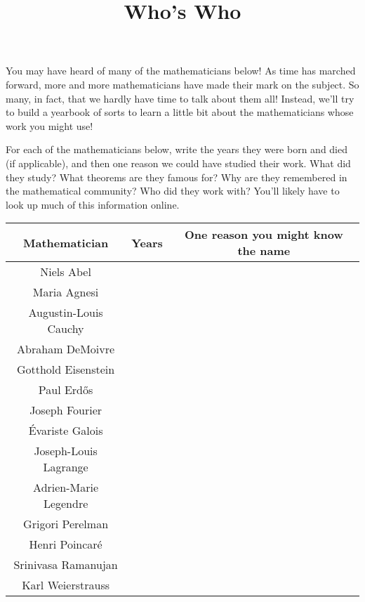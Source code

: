 \documentclass[handout,nooutcomes]{ximera}
\title{Who's Who}
\begin{document}
\begin{abstract}
    
\end{abstract}
\maketitle

You may have heard of many of the mathematicians below!  As time has marched forward, more and more mathematicians have made their mark on the subject.  So many, in fact, that we hardly have time to talk about them all!  Instead, we'll try to build a yearbook of sorts to learn a little bit about the mathematicians whose work you might use!

For each of the mathematicians below, write the years they were born and died (if applicable), and then one reason we could have studied their work.  What did they study?  What theorems are they famous for?  Why are they remembered in the mathematical community?  Who did they work with?  You'll likely have to look up much of this information online.


\begin{center}\begin{tabular}{|c|c|c|}
\hline
Mathematician & Years \hspace{2cm} & One reason you might know the name \hspace{2cm}  \\
\hline \hline

Niels Abel & &   \\ [0.3in]\hline
Maria Agnesi &  &  \\ [0.3in]\hline
Augustin-Louis Cauchy &  &  \\ [0.3in]\hline
Abraham DeMoivre & &   \\ [0.3in] \hline
Gotthold Eisenstein &  &  \\ [0.3in]\hline
Paul Erd\H{o}s &  &  \\ [0.3in]\hline
Joseph Fourier  & &  \\ [0.3in]\hline
\'{E}variste Galois  & &  \\ [0.3in]\hline
Joseph-Louis Lagrange  & &  \\ [0.3in]\hline
Adrien-Marie Legendre  & &  \\ [0.3in]\hline
Grigori Perelman  & &  \\ [0.3in]\hline
Henri Poincar\'{e} &  &  \\ [0.3in]\hline
Srinivasa Ramanujan &  &  \\ [0.3in]\hline
Karl Weierstrauss &  & \\ [0.3in]\hline



\end{tabular}\end{center}
\end{document}
